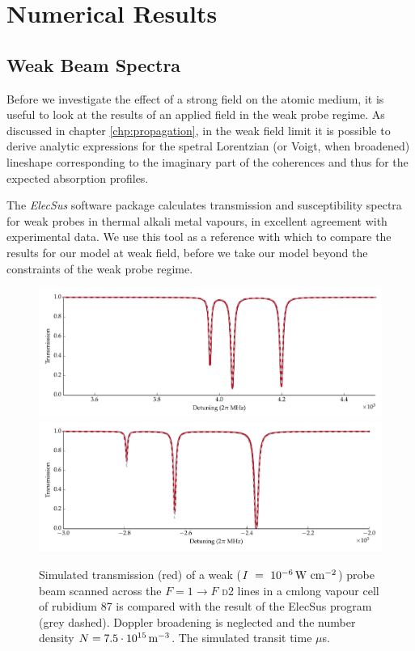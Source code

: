 \section{Numerical Results}
  \label{sec:twophoton_results}

  \subsection{Weak Beam Spectra}

    Before we investigate the effect of a strong field on the atomic medium, it
    is useful to look at the results of an applied field in the weak probe
    regime. As discussed in chapter \ref{chp:propagation}, in the weak field
    limit it is possible to derive analytic expressions for the spetral
    Lorentzian (or Voigt, when broadened)  lineshape corresponding to the
    imaginary part of the coherences and thus for the expected absorption
    profiles.

    The \textit{ElecSus} software package\cite{Zentile2015} calculates
    transmission and susceptibility spectra for weak probes in thermal alkali
    metal vapours, in excellent agreement with experimental
    data.\cite{Siddons2008,Weller2011} We use this tool as a reference with
    which to compare the results for our model at weak field, before we take our
    model beyond the constraints of the weak probe regime.

    \begin{figure}[]
    \includegraphics[width=\linewidth]
        {figs/05_twophoton/rb87_d2_hf_solve_scan_g2a_fig3.pdf}
    \includegraphics[width=\linewidth]
        {figs/05_twophoton/rb87_d2_hf_solve_scan_h1a_fig3.pdf}
    \caption{
    Simulated transmission (red) of a weak ($I~=~\unit[10^{-6}]{W~cm^{-2}}$)
    probe beam scanned across the  $F = 1 \rightarrow F$ \textsc{d2} lines in a
    \unit[1]{cm}long vapour cell of rubidium 87 is compared with the result of
    the ElecSus program (grey dashed). Doppler broadening is neglected and the
    number density $N = \unit[7.5\cdot10^{15}]{m^{-3}}$. The simulated transit
    time \unit[2]{$\mu$s}.
    }
    \label{fig:weak_d2} 
    \end{figure}


